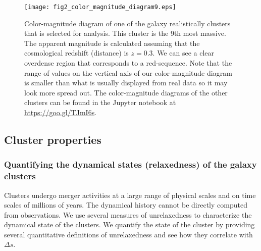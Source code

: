 \begin{figure}
	\centering
	\texttt{[image: fig2\_color\_magnitude\_diagram9.eps]}
	\caption{Color-magnitude diagram of one of the galaxy realistically clusters that is selected for 
		analysis. This cluster is the 9th most massive. 
		The apparent magnitude is calculated assuming that 
		the cosmological redshift (distance) is $z = 0.3$. 
		We can see a clear overdense region that corresponds to a red-sequence.
		Note that the range of values on the vertical axis of our color-magnitude diagram is  
		smaller than what is usually displayed from real data so it may look more
		spread out.	The color-magnitude diagrams of the other clusters can be found in the
		Jupyter notebook at \href{https://github.com/karenyyng/galaxy_DM_offset/blob/master/code/analyses/fig2_color_magnitude_diagram.ipynb}{https://goo.gl/TJmI6s}.
		\label{fig:color_magnitude_diagram}
	} 
\end{figure}


\subsection{Cluster properties}
\label{subsec:cluster_properties}

\subsubsection{Quantifying the dynamical states (relaxedness) of the galaxy clusters}
\label{subsubsec:relaxedness}

Clusters undergo merger activities at a large range of physical scales and 
on time scales of millions of years. 
The dynamical history cannot be directly 
computed from observations. We use several measures of unrelaxedness to characterize 
the dynamical state of the clusters.
We quantify the state of the cluster by providing several quantitative
definitions of unrelaxedness and see how they correlate with $\Delta s$.

